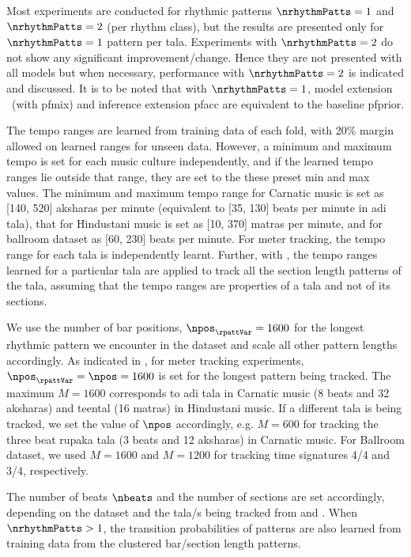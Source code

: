 Most experiments are conducted for rhythmic patterns $\nrhythmPatts=1$ and $\nrhythmPatts=2$ (per rhythm class), but the results are presented only for $\nrhythmPatts=1$ pattern per \gls{tala}. Experiments with $\nrhythmPatts=2$ do not show any significant improvement/change. Hence they are not presented with all models but when necessary, performance with $\nrhythmPatts=2$ is indicated and discussed. It is to be noted that with $\nrhythmPatts=1$, model extension \momodel\ (with \acrshort{pfmix}) and inference extension \acrshort{pfacc} are equivalent to the baseline \acrshort{pfprior}. 

The tempo ranges are learned from training data of each fold, with 20\%  margin allowed on learned ranges for unseen data. However, a minimum and maximum tempo is set for each music culture independently, and if the learned tempo ranges lie outside that range, they are set to the these preset min and max values. The minimum and maximum tempo range for Carnatic music is set as [140, 520] \glspl{akshara} per minute (equivalent to [35, 130] beats per minute in \gls{adi} \gls{tala}), that for Hindustani music is set as [10, 370] \glspl{matra} per minute, and for ballroom dataset as [60, 230] beats per minute. For meter tracking, the tempo range for each \gls{tala} is independently learnt. Further, with \spmodel, the tempo ranges learned for a particular \gls{tala} are applied to track all the section length patterns of the \gls{tala}, assuming that the tempo ranges are properties of a \gls{tala} and not of its sections.

We use the number of bar positions, $\npos_\rpattVar=1600$ for the longest rhythmic pattern we encounter in the dataset and scale all other pattern lengths accordingly. As indicated in , for meter tracking experiments, $\npos_\rpattVar = \npos = 1600$ is set for the longest pattern being tracked. The maximum $M=1600$ corresponds to \gls{adi} \gls{tala} in Carnatic music (8 beats and 32 \glspl{akshara}) and \gls{teental} (16 \glspl{matra}) in Hindustani music. If a different \gls{tala} is being tracked, we set the value of $\npos$ accordingly, e.g. $M=600$ for tracking the three beat \gls{rupaka} \gls{tala} (3 beats and 12 \glspl{akshara}) in Carnatic music. For Ballroom dataset, we used $M=1600$ and $M=1200$ for tracking time signatures 4/4 and 3/4, respectively. 

The number of beats $\nbeats$ and the number of sections are set accordingly, depending on the dataset and the \gls{tala}/s being tracked from  and . When $\nrhythmPatts > 1$, the transition probabilities of patterns are also learned from training data from the clustered bar/section length patterns. 

